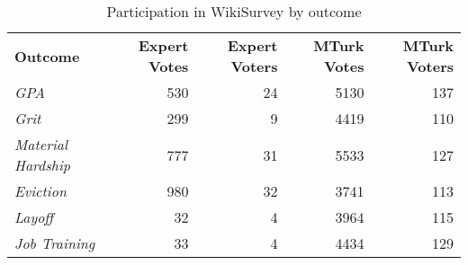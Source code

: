 \begin{table}[h]
\centering
\caption{Participation in WikiSurvey by outcome}
\label{wikisurvey}
\begin{tabular}{l|rrrr}
\toprule
\textbf{Outcome}           & \textbf{Expert Votes} & \textbf{Expert Voters} & \textbf{MTurk Votes} & \textbf{MTurk Voters} \\
\textit{GPA}               & 530                   & 24                     & 5130                 & 137                   \\
\textit{Grit}              & 299                   & 9                      & 4419                 & 110                   \\
\textit{Material Hardship} & 777                   & 31                     & 5533                 & 127                   \\
\textit{Eviction}          & 980                   & 32                     & 3741                 & 113                   \\
\textit{Layoff}            & 32                    & 4                      & 3964                 & 115                   \\
\textit{Job Training}      & 33                    & 4                      & 4434                 & 129                   \\
\bottomrule
\end{tabular}
\end{table}


